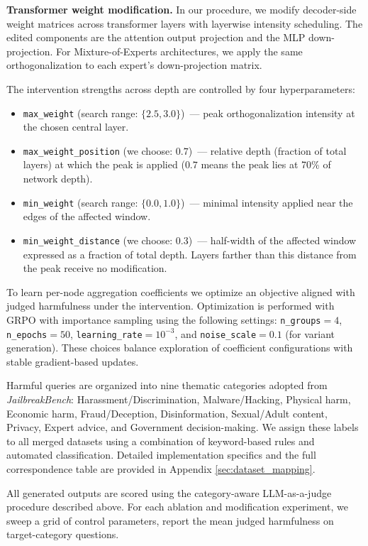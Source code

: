 \documentclass{article}
\theoremstyle{plain}
\theoremstyle{definition}
\theoremstyle{remark}
\begin{document}
\textbf{Transformer weight modification.} In our procedure, we modify decoder-side weight matrices across transformer layers with layerwise intensity scheduling. The edited components are the attention output projection and the MLP down-projection. For Mixture-of-Experts architectures, we apply the same orthogonalization to each expert’s down-projection matrix.

The intervention strengths across depth are controlled by four hyperparameters:
\begin{itemize}
\item \texttt{max\_weight} (search range: $\{2.5, 3.0\}$)~--- peak orthogonalization intensity at the chosen central layer.
\item \texttt{max\_weight\_position} (we choose: $0.7$)~--- relative depth (fraction of total layers) at which the peak is applied ($0.7$ means the peak lies at 70\% of network depth).
\item \texttt{min\_weight} (search range: $\{0.0, 1.0\}$)~--- minimal intensity applied near the edges of the affected window.
\item \texttt{min\_weight\_distance} (we choose: $0.3$)~--- half-width of the affected window expressed as a fraction of total depth. Layers farther than this distance from the peak receive no modification.
\end{itemize}

To learn per-node aggregation coefficients we optimize an objective aligned with judged harmfulness under the intervention. Optimization is performed with GRPO with importance sampling using the following settings: \texttt{n\_groups}$=4$, \texttt{n\_epochs}$=50$, \texttt{learning\_rate}$=10^{-3}$, and \texttt{noise\_scale}$=0.1$ (for variant generation). These choices balance exploration of coefficient configurations with stable gradient-based updates.

Harmful queries are organized into nine thematic categories adopted from \textit{JailbreakBench}: Harassment/Discrimination, Malware/Hacking, Physical harm, Economic harm, Fraud/Deception, Disinformation, Sexual/Adult content, Privacy, Expert advice, and Government decision-making. We assign these labels to all merged datasets using a combination of keyword-based rules and automated classification. Detailed implementation specifics and the full correspondence table are provided in Appendix \ref{sec:dataset_mapping}.

All generated outputs are scored using the category-aware LLM-as-a-judge procedure described above. For each ablation and modification experiment, we sweep a grid of control parameters, report the mean judged harmfulness on target-category questions.
\end{document}
